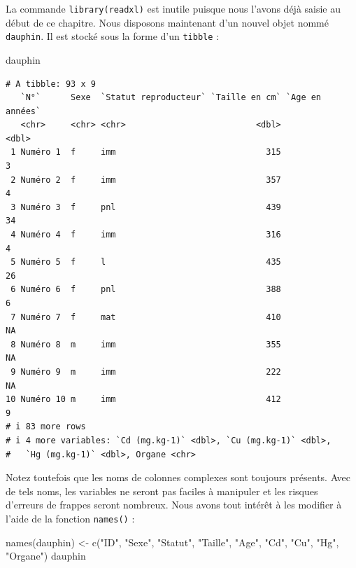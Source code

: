 \documentclass[
  a4paper,
  DIV=11,
  numbers=noendperiod,
  oneside]{scrreprt}
\newenvironment{Shaded}{}{}
\newcommand{\FunctionTok}[1]{\textcolor[rgb]{0.44,0.26,0.76}{#1}}
\newcommand{\NormalTok}[1]{\textcolor[rgb]{0.14,0.16,0.18}{#1}}
\newcommand{\OtherTok}[1]{\textcolor[rgb]{0.44,0.26,0.76}{#1}}
\newcommand{\StringTok}[1]{\textcolor[rgb]{0.01,0.18,0.38}{#1}}
\begin{document}
La commande \texttt{library(readxl)} est inutile puisque nous l'avons
déjà saisie au début de ce chapitre. Nous disposons maintenant d'un
nouvel objet nommé \texttt{dauphin}. Il est stocké sous la forme d'un
\texttt{tibble} :

\begin{Shaded}
\begin{Highlighting}[]
\NormalTok{dauphin}
\end{Highlighting}
\end{Shaded}

\begin{verbatim}
# A tibble: 93 x 9
   `N°`      Sexe  `Statut reproducteur` `Taille en cm` `Age en années`
   <chr>     <chr> <chr>                          <dbl>           <dbl>
 1 Numéro 1  f     imm                              315               3
 2 Numéro 2  f     imm                              357               4
 3 Numéro 3  f     pnl                              439              34
 4 Numéro 4  f     imm                              316               4
 5 Numéro 5  f     l                                435              26
 6 Numéro 6  f     pnl                              388               6
 7 Numéro 7  f     mat                              410              NA
 8 Numéro 8  m     imm                              355              NA
 9 Numéro 9  m     imm                              222              NA
10 Numéro 10 m     imm                              412               9
# i 83 more rows
# i 4 more variables: `Cd (mg.kg-1)` <dbl>, `Cu (mg.kg-1)` <dbl>,
#   `Hg (mg.kg-1)` <dbl>, Organe <chr>
\end{verbatim}

Notez toutefois que les noms de colonnes complexes sont toujours
présents. Avec de tels noms, les variables ne seront pas faciles à
manipuler et les risques d'erreurs de frappes seront nombreux. Nous
avons tout intérêt à les modifier à l'aide de la fonction
\texttt{names()} :

\begin{Shaded}
\begin{Highlighting}[]
\FunctionTok{names}\NormalTok{(dauphin) }\OtherTok{\textless{}{-}} \FunctionTok{c}\NormalTok{(}\StringTok{"ID"}\NormalTok{, }\StringTok{"Sexe"}\NormalTok{, }\StringTok{"Statut"}\NormalTok{, }\StringTok{"Taille"}\NormalTok{,}
                    \StringTok{"Age"}\NormalTok{, }\StringTok{"Cd"}\NormalTok{, }\StringTok{"Cu"}\NormalTok{, }\StringTok{"Hg"}\NormalTok{, }\StringTok{"Organe"}\NormalTok{)}
\NormalTok{dauphin}
\end{Highlighting}
\end{Shaded}
\end{document}
